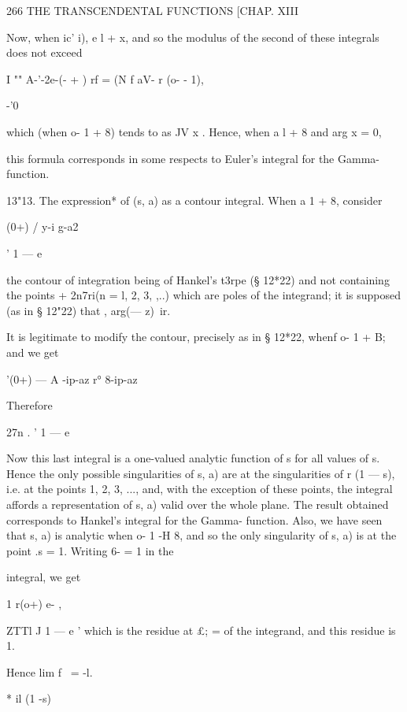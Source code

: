 266 THE TRANSCENDENTAL FUNCTIONS [CHAP. XIII

Now, when ic' i), e l + x, and so the modulus of the second of these
integrals does not exceed

I "" A-'-2e-(- + ) rf = (N f aV- r (o- - 1),

-'0

which (when o- 1 + 8) tends to as JV x . Hence, when a l + 8 and arg x
= 0,



this formula corresponds in some respects to Euler's integral for the
Gamma- function.

13"13. The expression* of (s, a) as a contour integral. When a 1 + 8,
consider

(0+) / y-i g-a2



' 1 — e



the contour of integration being of Hankel's t3rpe (§ 12*22) and not
containing the points + 2n7ri(n = l, 2, 3, ,..) which are poles of the
integrand; it is supposed (as in § 12"22) that , arg(— z)\ ir.

It is legitimate to modify the contour, precisely as in § 12*22, whenf
o- 1 + B; and we get



'(0+) — A -ip-az r° 8-ip-az



Therefore



27n . ' 1 — e



Now this last integral is a one-valued analytic function of s for all
values of s. Hence the only possible singularities of s, a) are at the
singularities of r (1 — s), i.e. at the points 1, 2, 3, ..., and, with
the exception of these points, the integral affords a representation
of s, a) valid over the whole plane. The result obtained corresponds
to Hankel's integral for the Gamma- function. Also, we have seen that
s, a) is analytic when o- 1 -H 8, and so the only singularity of s, a)
is at the point .s = 1. Writing 6- = 1 in the

integral, we get

1 r(o+) e- ,

ZTTl J 1 — e ' which is the residue at £; = of the integrand, and this
residue is 1.

Hence lim f \ = -l.

* il (1 -s)

